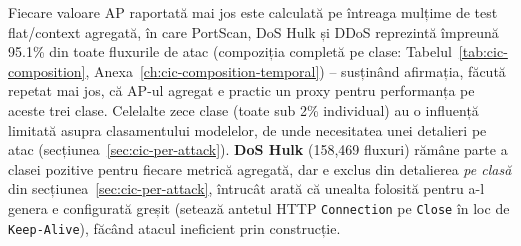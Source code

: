 Fiecare valoare AP raportată mai jos este calculată pe întreaga mulțime de test flat/context agregată, în care PortScan, DoS Hulk și DDoS reprezintă împreună 95.1\% din toate fluxurile de atac (compoziția completă pe clase: Tabelul~\ref{tab:cic-composition}, Anexa~\ref{ch:cic-composition-temporal}) -- susținând afirmația, făcută repetat mai jos, că AP-ul agregat e practic un proxy pentru performanța pe aceste trei clase. Celelalte zece clase (toate sub 2\% individual) au o influență limitată asupra clasamentului modelelor, de unde necesitatea unei detalieri pe atac (secțiunea~\ref{sec:cic-per-attack}).
\textbf{DoS Hulk} (158{,}469 fluxuri) rămâne parte a clasei pozitive pentru fiecare metrică agregată, dar e exclus din detalierea \emph{pe clasă} din secțiunea~\ref{sec:cic-per-attack}, întrucât \textcite{engelen2021troubleshooting} arată că unealta folosită pentru a-l genera e configurată greșit (setează antetul HTTP \texttt{Connection} pe \texttt{Close} în loc de \texttt{Keep-Alive}), făcând atacul ineficient prin construcție.

